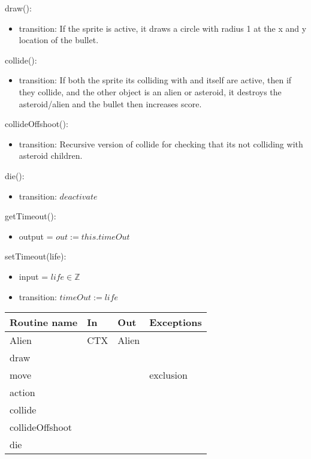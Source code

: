 \documentclass[12pt]{article}
\begin{document}
\noindent draw():
\begin{itemize}
    \item transition: If the sprite is active, it draws a circle with radius 1 at the x and y location of the bullet.
\end{itemize}

\noindent collide():
\begin{itemize}
    \item transition: If both the sprite its colliding with and itself are active, then if they collide, and the other object is an alien or asteroid, it destroys the asteroid/alien and the bullet then increases score.
\end{itemize}

\noindent collideOffshoot():
\begin{itemize}
    \item transition: Recursive version of collide for checking that its not colliding with asteroid children.
\end{itemize}
\newpage

\noindent die():
\begin{itemize}
    \item transition: $deactivate$
\end{itemize}

\noindent getTimeout():
\begin{itemize}
    \item output = $out := this.timeOut$
\end{itemize}

\noindent setTimeout(life):
\begin{itemize}
    \item input = $life \in \mathbb{Z}$
    \item transition: $timeOut := life$
\end{itemize}

\newpage

\begin{tabular}{| l | l | l | l |}
    \hline
    \textbf{Routine name} & \textbf{In} & \textbf{Out} & \textbf{Exceptions}\\
    \hline
    Alien & CTX & Alien & ~\\
    \hline
    draw & ~ & ~ & ~\\
    \hline
    move & ~ & ~ & exclusion\\
    \hline
    action & ~ & ~ & ~\\
    \hline
    collide & ~ & ~ & ~\\
    \hline
    collideOffshoot & ~ & ~ & ~\\
    \hline
    die & ~ & ~ & ~\\
    \hline
\end{tabular}
\end{document}
